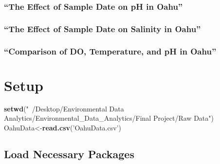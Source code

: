 \documentclass[12pt,]{article}
\newenvironment{Shaded}{\begin{snugshade}}{\end{snugshade}}
\newcommand{\KeywordTok}[1]{\textcolor[rgb]{0.13,0.29,0.53}{\textbf{#1}}}
\newcommand{\StringTok}[1]{\textcolor[rgb]{0.31,0.60,0.02}{#1}}
\newcommand{\NormalTok}[1]{#1}
\begin{document}
\subsubsection{\texorpdfstring{``The Effect of Sample Date on pH in
Oahu''}{The Effect of Sample Date on pH in Oahu}}\label{the-effect-of-sample-date-on-ph-in-oahu}

\subsubsection{\texorpdfstring{``The Effect of Sample Date on Salinity
in
Oahu''}{The Effect of Sample Date on Salinity in Oahu}}\label{the-effect-of-sample-date-on-salinity-in-oahu}

\subsubsection{\texorpdfstring{``Comparison of DO, Temperature, and pH
in
Oahu''}{Comparison of DO, Temperature, and pH in Oahu}}\label{comparison-of-do-temperature-and-ph-in-oahu}

\newpage

\section{Setup}\label{setup-1}

\begin{Shaded}
\begin{Highlighting}[]
\KeywordTok{setwd}\NormalTok{(}\StringTok{"~/Desktop/Environmental Data Analytics/Environmental_Data_Analytics/Final Project/Raw Data"}\NormalTok{)}
\NormalTok{OahuData<-}\KeywordTok{read.csv}\NormalTok{(}\StringTok{'OahuData.csv'}\NormalTok{)}
\end{Highlighting}
\end{Shaded}

\subsection{Load Necessary Packages}\label{load-necessary-packages}
\end{document}
